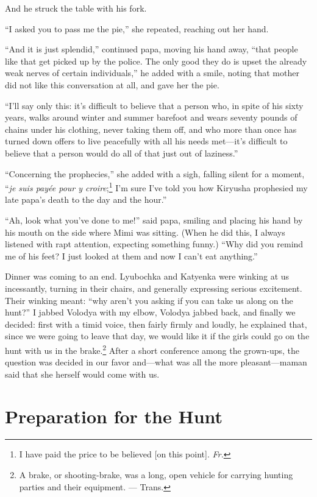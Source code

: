 And he struck the table with his fork.

``I asked you to pass me the pie,'' she repeated, reaching out her hand. %

``And it is just splendid,'' continued papa, moving his hand away, ``that people like that get picked up by the police. The only good they do is upset the already weak nerves of certain individuals,'' he added with a smile, noting that mother did not like this conversation at all, and gave her the pie. %

``I'll say only this: it's difficult to believe that a person who, in spite of his sixty years, walks around winter and summer barefoot and wears seventy pounds of chains under his clothing, never taking them off, and who more than once has turned down offers to live peacefully with all his needs met---it's difficult to believe that a person would do all of that just out of laziness.'' %

``Concerning the prophecies,'' she added with a sigh, falling silent for a moment, ``\textit{je suis pay\'ee pour y croire};\footnote{I have paid the price to be believed [on this point]. \textit{Fr.}} I'm sure I've told you how Kiryusha prophesied my late papa's death to the day and the hour.'' %

``Ah, look what you've done to me!'' said papa, smiling and placing his hand by his mouth on the side where Mimi was sitting. (When he did this, I always listened with rapt attention, expecting something funny.) ``Why did you remind me of his feet? I just looked at them and now I can't eat anything.'' %

Dinner was coming to an end. Lyubochka and Katyenka were winking at us incessantly, turning in their chairs, and generally expressing serious excitement. Their winking meant: ``why aren't you asking if you can take us along on the hunt?'' I jabbed Volodya with my elbow, Volodya jabbed back, and finally we decided: first with a timid voice, then fairly firmly and loudly, he explained that, since we were going to leave that day, we would like it if the girls could go on the hunt with us in the brake.\footnote{A brake, or shooting-brake, was a long, open vehicle for carrying hunting parties and their equipment. --- Trans.} After a short conference among the grown-ups, the question was decided in our favor and---what was all the more pleasant---maman said that she herself would come with us.

\chapter{Preparation for the Hunt} %

